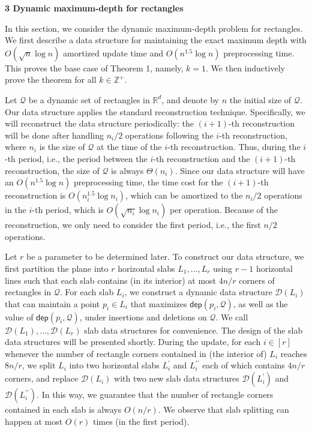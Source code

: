 \documentclass[10pt,a4paper]{article}
\begin{document}
\par\medskip\noindent\textbf{3 Dynamic maximum-depth for rectangles}\par
In this section, we consider the dynamic maximum-depth problem for rectangles. We first describe a data structure for maintaining the exact maximum depth with $O(\sqrt{n}\log n)$ amortized update time and $O(n^{1.5}\log n)$ preprocessing time. This proves the base case of Theorem 1, namely, $k=1$. We then inductively prove the theorem for all $k\in\mathbb{Z}^{+}$.
\par
\par
Let $\mathcal{Q}$ be a dynamic set of rectangles in $\mathbb{R}^{d}$, and denote by $n$ the initial size of $\mathcal{Q}$. Our data structure applies the standard reconstruction technique. Specifically, we will reconstruct the data structure periodically: the $(i+1)$-th reconstruction will be done after handling $n_{i}/2$ operations following the $i$-th reconstruction, where $n_{i}$ is the size of $\mathcal{Q}$ at the time of the $i$-th reconstruction. Thus, during the $i$-th period, i.e., the period between the $i$-th reconstruction and the $(i+1)$-th reconstruction, the size of $\mathcal{Q}$ is always $\Theta(n_{i})$. Since our data structure will have an $O(n^{1.5}\log n)$ preprocessing time, the time cost for the $(i+1)$-th reconstruction is $O(n_{i}^{1.5}\log n_{i})$, which can be amortized to the $n_{i}/2$ operations in the $i$-th period, which is $O(\sqrt{n_{i}}\log n_{i})$ per operation. Because of the reconstruction, we only need to consider the first period, i.e., the first $n/2$ operations.
\par
\par
Let $r$ be a parameter to be determined later. To construct our data structure, we first partition the plane into $r$ horizontal slabs $L_{1},\dots,L_{r}$ using $r-1$ horizontal lines such that each slab contains (in its interior) at most $4n/r$ corners of rectangles in $\mathcal{Q}$. For each slab $L_{i}$, we construct a dynamic data structure $\mathcal{D}(L_{i})$ that can maintain a point $p_{i}\in L_{i}$ that maximizes $\mathsf{dep}(p_{i},\mathcal{Q})$, as well as the value of $\mathsf{dep}(p_{i},\mathcal{Q})$, under insertions and deletions on $\mathcal{Q}$. We call $\mathcal{D}(L_{1}),\dots,\mathcal{D}(L_{r})$ slab data structures for convenience. The design of the slab data structures will be presented shortly. During the update, for each $i\in[r]$ whenever the number of rectangle corners contained in (the interior of) $L_{i}$ reaches $8n/r$, we split $L_{i}$ into two horizontal slabs $L_{i}^{\prime}$ and $L_{i}^{\prime\prime}$ each of which contains $4n/r$ corners, and replace $\mathcal{D}(L_{i})$ with two new slab data structures $\mathcal{D}(L_{i}^{\prime})$ and $\mathcal{D}(L_{i}^{\prime\prime})$. In this way, we guarantee that the number of rectangle corners contained in each slab is always $O(n/r)$. We observe that slab splitting can happen at most $O(r)$ times (in the first period).
\end{document}
